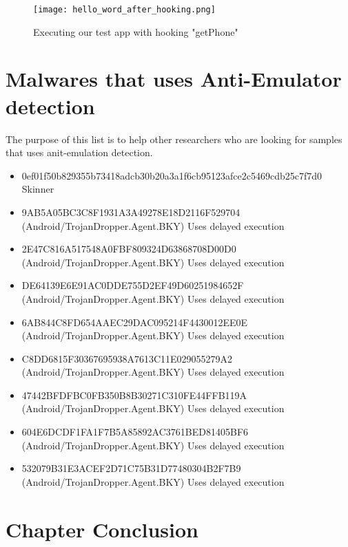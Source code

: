 \documentclass[../main.tex]{subfile}
\begin{document}
		\begin{figure}
			\texttt{[image: hello\_word\_after\_hooking.png]}
			\caption{Executing our test app with hooking  "getPhone"}
			\label{fig:hooking_execute}			
		\end{figure}	
	
	
	\section{Malwares that uses Anti-Emulator detection}
	The purpose of this list is to help other researchers who are looking for samples that uses anit-emulation detection.
	\begin{itemize}
		\item 0ef01f50b829355b73418adcb30b20a3a1f6cb95123afce2c5469cdb25c7f7d0 Skinner
		\item 9AB5A05BC3C8F1931A3A49278E18D2116F529704 (Android/TrojanDropper.Agent.BKY) Uses delayed execution \cite{eset_multi_stage_malware}
		\item 2E47C816A517548A0FBF809324D63868708D00D0 (Android/TrojanDropper.Agent.BKY) Uses delayed execution \cite{eset_multi_stage_malware}
		\item DE64139E6E91AC0DDE755D2EF49D60251984652F (Android/TrojanDropper.Agent.BKY) Uses delayed execution \cite{eset_multi_stage_malware}
		\item 6AB844C8FD654AAEC29DAC095214F4430012EE0E (Android/TrojanDropper.Agent.BKY) Uses delayed execution \cite{eset_multi_stage_malware}
		\item C8DD6815F30367695938A7613C11E029055279A2 (Android/TrojanDropper.Agent.BKY) Uses delayed execution \cite{eset_multi_stage_malware}
		\item 47442BFDFBC0FB350B8B30271C310FE44FFB119A (Android/TrojanDropper.Agent.BKY) Uses delayed execution \cite{eset_multi_stage_malware}
		\item 604E6DCDF1FA1F7B5A85892AC3761BED81405BF6 (Android/TrojanDropper.Agent.BKY) Uses delayed execution \cite{eset_multi_stage_malware}
		\item 532079B31E3ACEF2D71C75B31D77480304B2F7B9 (Android/TrojanDropper.Agent.BKY) Uses delayed execution \cite{eset_multi_stage_malware}
	\end{itemize}
	\section{Chapter Conclusion}
	
			
\end{document}
